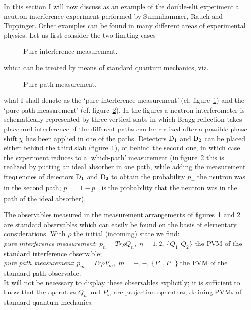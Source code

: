 \documentclass{ws-procs975x65}
\begin{document}
{In this section I will now discuss as an example of the
double-slit experiment a neutron interference experiment performed
by Summhammer, Rauch and Tuppinger\cite{SuRaTu}. Other examples
can be found in many different areas of experimental
physics\cite{dM2002}. Let us first consider the two limiting cases
\begin{figure}
 \caption{Pure interference measurement.}
  \label{fig1}
\end{figure}
which can be treated by means of standard quantum mechanics, viz.
\begin{figure}
 \caption{Pure path measurement.}
  \label{fig2}
\end{figure}
what I shall denote as the `pure interference measurement' (cf.
figure~\ref{fig1}) and the `pure path measurement' (cf.
figure~\ref{fig2}). In the figures a neutron interferometer is
schematically represented by three vertical slabs in which Bragg
reflection takes place and interference of the different paths can
be realized after a possible phase shift $\chi$ has been applied
in one of the paths. Detectors $\rm D_1$ and $\rm D_2$ can be
placed either behind the third slab (figure~\ref{fig1}), or behind
the second one, in which case the experiment reduces to a
`which-path' measurement (in figure~\ref{fig2} this is realized by
putting an ideal absorber in one path, while adding the
measurement frequencies of detectors $\rm D_1$ and $\rm D_2$ to
obtain the probability $p_+$ the neutron was in the second path;
$p_- = 1-p_+$ is the probability that the neutron was in the path
of the ideal absorber).

The observables measured in the measurement arrangements of
figures~\ref{fig1} and \ref{fig2} are standard observables which
can easily be found on the basis of elementary
considerations\cite{MuMa90}. With $\rho$ the initial (incoming) state we find: \\
\noindent \textit{pure interference measurement}: $p_n = Tr \rho
Q_n,\;n=1,2$, $\{Q_1,Q_2\}$ the PVM of the standard
interference observable;\\
\noindent \textit{pure path measurement}: $p_m = Tr \rho P_m,\;
m=+,-$, $\{P_+,P_-\}$ the PVM of the standard path observable.
\\It will not be necessary to display these observables
explicitly; it is sufficient to know that the operators $Q_n$ and
$P_m$ are projection operators, defining PVMs of standard quantum
mechanics.

}
\end{document}
